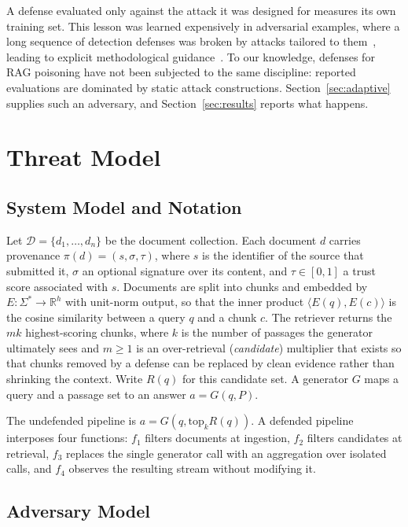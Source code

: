 \documentclass[information,article,submit,moreauthors]{Definitions/mdpi}
\begin{document}
A defense evaluated only against the attack it was designed for measures its own training set.
This lesson was learned expensively in adversarial examples, where a long sequence of detection
defenses was broken by attacks tailored to
them~\citep{carlini2017bypassing,athalye2018obfuscated,tramer2020adaptive}, leading to explicit
methodological guidance~\citep{carlini2019evaluating}. To our knowledge, defenses for RAG
poisoning have not been subjected to the same discipline: reported evaluations are dominated by
static attack constructions. Section~\ref{sec:adaptive} supplies such an adversary, and
Section~\ref{sec:results} reports what happens.

\section{Threat Model}
\label{sec:threat}

\subsection{System Model and Notation}

Let $\mathcal{D} = \{d_1, \dots, d_n\}$ be the document collection. Each document $d$ carries
provenance $\pi(d) = (s, \sigma, \tau)$, where $s$ is the identifier of the source that
submitted it, $\sigma$ an optional signature over its content, and $\tau \in [0,1]$ a trust
score associated with $s$. Documents are split into chunks and embedded by
$E : \Sigma^{*} \rightarrow \mathbb{R}^{h}$ with unit-norm output, so that the inner product
$\langle E(q), E(c) \rangle$ is the cosine similarity between a query $q$ and a chunk $c$. The
retriever returns the $mk$ highest-scoring chunks, where $k$ is the number of passages the
generator ultimately sees and $m \ge 1$ is an over-retrieval (\emph{candidate}) multiplier that
exists so that chunks removed by a defense can be replaced by clean evidence rather than
shrinking the context. Write $R(q)$ for this candidate set. A generator $G$ maps a query and a
passage set to an answer $a = G(q, P)$.

The undefended pipeline is $a = G\!\left(q, \mathrm{top}_k R(q)\right)$. A defended pipeline
interposes four functions: $f_1$ filters documents at ingestion, $f_2$ filters candidates at
retrieval, $f_3$ replaces the single generator call with an aggregation over isolated calls,
and $f_4$ observes the resulting stream without modifying it.

\subsection{Adversary Model}
\end{document}
